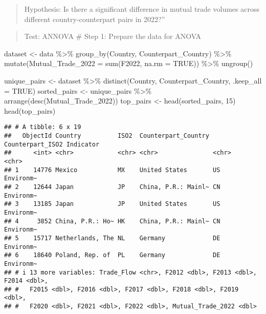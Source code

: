 \documentclass[
]{article}
\newenvironment{Shaded}{\begin{snugshade}}{\end{snugshade}}
\newcommand{\AttributeTok}[1]{\textcolor[rgb]{0.77,0.63,0.00}{#1}}
\newcommand{\ConstantTok}[1]{\textcolor[rgb]{0.00,0.00,0.00}{#1}}
\newcommand{\DecValTok}[1]{\textcolor[rgb]{0.00,0.00,0.81}{#1}}
\newcommand{\FunctionTok}[1]{\textcolor[rgb]{0.00,0.00,0.00}{#1}}
\newcommand{\NormalTok}[1]{#1}
\newcommand{\OtherTok}[1]{\textcolor[rgb]{0.56,0.35,0.01}{#1}}
\newcommand{\SpecialCharTok}[1]{\textcolor[rgb]{0.00,0.00,0.00}{#1}}
\begin{document}
\begin{quote}
Hypothesis: Is there a significant difference in mutual trade volumes
across different country-counterpart pairs in 2022?''
\end{quote}

\begin{quote}
Test: ANNOVA \# Step 1: Prepare the data for ANOVA
\end{quote}

\begin{Shaded}
\begin{Highlighting}[]
\NormalTok{dataset }\OtherTok{\textless{}{-}}\NormalTok{ data }\SpecialCharTok{\%\textgreater{}\%}
  \FunctionTok{group\_by}\NormalTok{(Country, Counterpart\_Country) }\SpecialCharTok{\%\textgreater{}\%}
  \FunctionTok{mutate}\NormalTok{(}\AttributeTok{Mutual\_Trade\_2022 =} \FunctionTok{sum}\NormalTok{(F2022, }\AttributeTok{na.rm =} \ConstantTok{TRUE}\NormalTok{)) }\SpecialCharTok{\%\textgreater{}\%}
  \FunctionTok{ungroup}\NormalTok{()}
\end{Highlighting}
\end{Shaded}

\begin{Shaded}
\begin{Highlighting}[]
\NormalTok{unique\_pairs }\OtherTok{\textless{}{-}}\NormalTok{ dataset }\SpecialCharTok{\%\textgreater{}\%}
  \FunctionTok{distinct}\NormalTok{(Country, Counterpart\_Country, }\AttributeTok{.keep\_all =} \ConstantTok{TRUE}\NormalTok{)}
\NormalTok{sorted\_pairs }\OtherTok{\textless{}{-}}\NormalTok{ unique\_pairs }\SpecialCharTok{\%\textgreater{}\%}
  \FunctionTok{arrange}\NormalTok{(}\FunctionTok{desc}\NormalTok{(Mutual\_Trade\_2022))}
\NormalTok{top\_pairs }\OtherTok{\textless{}{-}} \FunctionTok{head}\NormalTok{(sorted\_pairs, }\DecValTok{15}\NormalTok{)}
\FunctionTok{head}\NormalTok{(top\_pairs)}
\end{Highlighting}
\end{Shaded}

\begin{verbatim}
## # A tibble: 6 x 19
##   ObjectId Country          ISO2  Counterpart_Country Counterpart_ISO2 Indicator
##      <int> <chr>            <chr> <chr>               <chr>            <chr>    
## 1    14776 Mexico           MX    United States       US               Environm~
## 2    12644 Japan            JP    China, P.R.: Mainl~ CN               Environm~
## 3    13185 Japan            JP    United States       US               Environm~
## 4     3852 China, P.R.: Ho~ HK    China, P.R.: Mainl~ CN               Environm~
## 5    15717 Netherlands, The NL    Germany             DE               Environm~
## 6    18640 Poland, Rep. of  PL    Germany             DE               Environm~
## # i 13 more variables: Trade_Flow <chr>, F2012 <dbl>, F2013 <dbl>, F2014 <dbl>,
## #   F2015 <dbl>, F2016 <dbl>, F2017 <dbl>, F2018 <dbl>, F2019 <dbl>,
## #   F2020 <dbl>, F2021 <dbl>, F2022 <dbl>, Mutual_Trade_2022 <dbl>
\end{verbatim}
\end{document}
